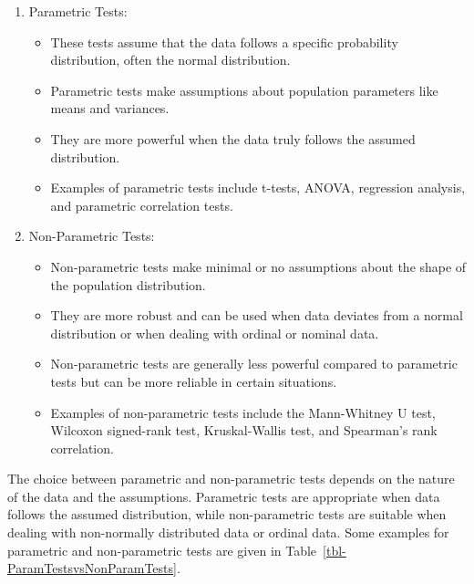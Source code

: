 \documentclass[
  a4paper,
]{scrbook}
\providecommand{\tightlist}{%
  \setlength{\itemsep}{0pt}\setlength{\parskip}{0pt}}\usepackage{longtable,booktabs,array}
\begin{document}
\begin{enumerate}
\def\labelenumi{\arabic{enumi}.}
\tightlist
\item
  Parametric Tests:

  \begin{itemize}
  \tightlist
  \item
    These tests assume that the data follows a specific probability
    distribution, often the normal distribution.
  \item
    Parametric tests make assumptions about population parameters like
    means and variances.
  \item
    They are more powerful when the data truly follows the assumed
    distribution.
  \item
    Examples of parametric tests include t-tests, ANOVA, regression
    analysis, and parametric correlation tests.
  \end{itemize}
\item
  Non-Parametric Tests:

  \begin{itemize}
  \tightlist
  \item
    Non-parametric tests make minimal or no assumptions about the shape
    of the population distribution.
  \item
    They are more robust and can be used when data deviates from a
    normal distribution or when dealing with ordinal or nominal data.
  \item
    Non-parametric tests are generally less powerful compared to
    parametric tests but can be more reliable in certain situations.
  \item
    Examples of non-parametric tests include the Mann-Whitney U test,
    Wilcoxon signed-rank test, Kruskal-Wallis test, and Spearman's rank
    correlation.
  \end{itemize}
\end{enumerate}

The choice between parametric and non-parametric tests depends on the
nature of the data and the assumptions. Parametric tests are appropriate
when data follows the assumed distribution, while non-parametric tests
are suitable when dealing with non-normally distributed data or ordinal
data. Some examples for parametric and non-parametric tests are given in
Table~\ref{tbl-ParamTestsvsNonParamTests}.

\begingroup
\setlength{}
\setlength{}\fontsize{15.0pt}{18.0pt}\selectfont
\end{document}
